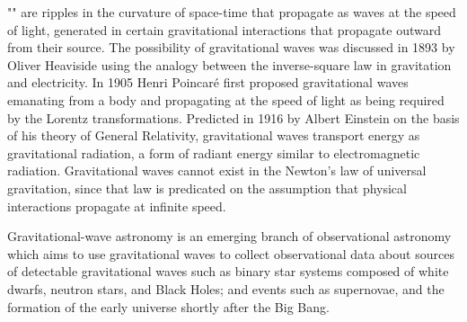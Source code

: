 	"" are ripples in the curvature of space-time that propagate as waves at the speed of light, generated in certain gravitational interactions that propagate outward from their source. The possibility of gravitational waves was discussed in 1893 by Oliver Heaviside using the analogy between the inverse-square law in gravitation and electricity. In 1905 Henri Poincaré first proposed gravitational waves emanating from a body and propagating at the speed of light as being required by the Lorentz transformations. Predicted in 1916 by Albert Einstein on the basis of his theory of General Relativity, gravitational waves transport energy as gravitational radiation, a form of radiant energy similar to electromagnetic radiation. Gravitational waves cannot exist in the Newton's law of universal gravitation, since that law is predicated on the assumption that physical interactions propagate at infinite speed.
	
	Gravitational-wave astronomy is an emerging branch of observational astronomy which aims to use gravitational waves to collect observational data about sources of detectable gravitational waves such as binary star systems composed of white dwarfs, neutron stars, and Black Holes; and events such as supernovae, and the formation of the early universe shortly after the Big Bang.
	
